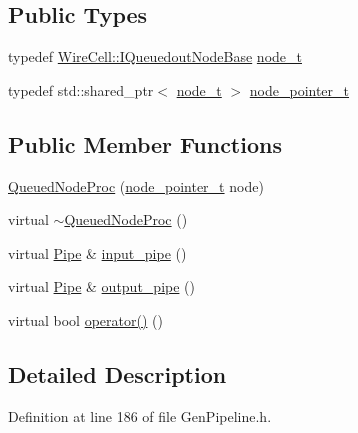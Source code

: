 \subsection*{Public Types}
\begin{DoxyCompactItemize}
\item 
typedef \hyperlink{class_wire_cell_1_1_i_queuedout_node_base}{Wire\+Cell\+::\+I\+Queuedout\+Node\+Base} \hyperlink{class_wire_cell_1_1_queued_node_proc_a7b820a1329c30cecec296f7fe9d0029b}{node\+\_\+t}
\item 
typedef std\+::shared\+\_\+ptr$<$ \hyperlink{class_wire_cell_1_1_queued_node_proc_a7b820a1329c30cecec296f7fe9d0029b}{node\+\_\+t} $>$ \hyperlink{class_wire_cell_1_1_queued_node_proc_a0cfabdd31dec9b3648a1fc0e3cdb090b}{node\+\_\+pointer\+\_\+t}
\end{DoxyCompactItemize}
\subsection*{Public Member Functions}
\begin{DoxyCompactItemize}
\item 
\hyperlink{class_wire_cell_1_1_queued_node_proc_a8c99324dae482663fccd443ecf69b559}{Queued\+Node\+Proc} (\hyperlink{class_wire_cell_1_1_queued_node_proc_a0cfabdd31dec9b3648a1fc0e3cdb090b}{node\+\_\+pointer\+\_\+t} node)
\item 
virtual \hyperlink{class_wire_cell_1_1_queued_node_proc_ae75de0bfaac380a57d44d51545eb56ee}{$\sim$\+Queued\+Node\+Proc} ()
\item 
virtual \hyperlink{namespace_wire_cell_afce9bb01c731347c3d4c8ca9d4ed804f}{Pipe} \& \hyperlink{class_wire_cell_1_1_queued_node_proc_a5cbb0b00898b61cbda322e5376ae7608}{input\+\_\+pipe} ()
\item 
virtual \hyperlink{namespace_wire_cell_afce9bb01c731347c3d4c8ca9d4ed804f}{Pipe} \& \hyperlink{class_wire_cell_1_1_queued_node_proc_acf62ea51c7b689e364721888479473b6}{output\+\_\+pipe} ()
\item 
virtual bool \hyperlink{class_wire_cell_1_1_queued_node_proc_a7ce2fbfadbf84f8031ef7315e7a6ee70}{operator()} ()
\end{DoxyCompactItemize}


\subsection{Detailed Description}


Definition at line 186 of file Gen\+Pipeline.\+h.



